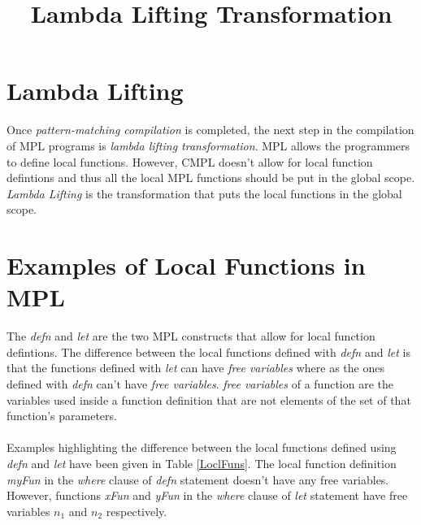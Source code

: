 \documentclass[11pt]{article}
\title{Lambda Lifting Transformation}
\begin{document}
\maketitle
\section {Lambda Lifting} 
Once {\em pattern-matching compilation} is completed, the next step in the compilation of MPL programs is {\em lambda lifting transformation}. MPL allows the programmers to define local functions. However, CMPL doesn't allow for local function defintions and thus all the local MPL functions should be put in the global scope. {\em Lambda Lifting} is the transformation that puts the local functions in the global scope.

\section {Examples of Local Functions in MPL}


The {\em defn} and {\em let} are the two MPL constructs that allow for local function defintions. The difference between the local functions defined with {\em defn} and {\em let} is that the functions defined with {\em let} can have {\em free variables} where as the ones defined with {\em defn} can't have {\em free variables}. {\em free variables} of a function are the variables used inside a function definition that are not elements of the set of that function's parameters. 
~~\\~~\\ 
Examples highlighting the difference between the local functions defined using {\em defn} and {\em let} have been given in Table \ref {LoclFuns}. The local function definition {\em myFun} in the {\em where} clause of {\em defn} statement doesn't have any free variables. However, functions {\em xFun} and {\em yFun} in the {\em where} clause of {\em let} statement have free variables $n_1$ and $n_2$ respectively.
\end{document}
